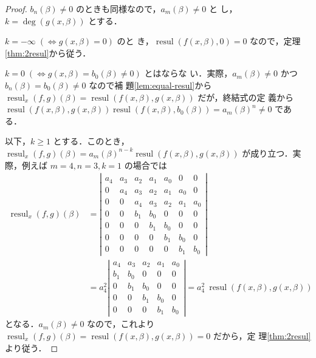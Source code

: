 \documentclass[12pt, uplatex, dvipdfmx]{jsarticle}
\theoremstyle{definition}
\DeclareMathOperator{\resul}{resul}
\begin{document}
\begin{proof}
  $b_n(\beta)\neq 0$ のときも同様なので，$a_m(\beta) \neq 0$ と
  し，$k=\deg(g(x,\beta))$ とする．

  $k=-\infty\; (\Leftrightarrow g(x,\beta)=0)$ のと
  き，$\resul(f(x,\beta), 0)=0$ なので，定理\ref{thm:2resul}から従う．
  

  $k=0 \; (\Leftrightarrow g(x,\beta) = b_0(\beta) \neq 0)$ とはならな
  い．実際，$a_m(\beta) \neq 0$ かつ $b_n(\beta)=b_0(\beta) \neq 0$ なので補
  題\ref{lem:equal-resul}から
  $\resul_x(f,g)(\beta)=\resul(f(x,\beta),g(x,\beta))$ だが，終結式の定
  義から $\resul(f(x,\beta), g(x, \beta)) \resul(f(x,\beta), b_0(\beta))= a_m(\beta)^n \neq 0$ であ
  る．
  
  以下，$k\geq 1$
  とする．このとき，$\resul_x(f,g)(\beta) = a_m(\beta)^{n-k}
  \resul(f(x,\beta), g(x,\beta))$ が成り立つ．実際，例えば $m=4, n=3,
  k=1$ の場合では
  \[
    \begin{aligned}
      \resul_x(f,g)(\beta) &= \left|
        \begin{array}{ccccccc}
          a_4 & a_3 & a_2 & a_1 & a_0 & 0 & 0\\
          0 & a_4 & a_3 & a_2 & a_1 & a_0 & 0\\
          0 & 0 & a_4 & a_3 & a_2 & a_1 & a_0\\
          0 & 0 & b_1 & b_0 & 0 & 0 & 0\\
          0 & 0 & 0 & b_1 & b_0 & 0 & 0\\
          0 & 0 & 0 & 0 & b_1 & b_0 & 0\\
          0 & 0 & 0 & 0 & 0 & b_1 & b_0
        \end{array}
      \right|\\
      & = a_4^2 \left|
        \begin{array}{ccccc}
          a_4 & a_3& a_2 & a_1 & a_0\\
          b_1 & b_0 & 0 & 0 & 0\\
          0 & b_1 & b_0 & 0 & 0\\
          0 & 0 & b_1 & b_0 & 0\\
          0 & 0 & 0 & b_1 & b_0
        \end{array}
      \right| = a_4^2 ~\resul(f(x,\beta),g(x,\beta)) 
    \end{aligned}
  \]
  となる．$a_m(\beta) \neq 0$ なので，これより
  $\resul_x(f,g)(\beta)= \resul(f(x,\beta), g(x,\beta))=0$ だから，定
  理\ref{thm:2resul}より従う．
\end{proof}
\end{document}
